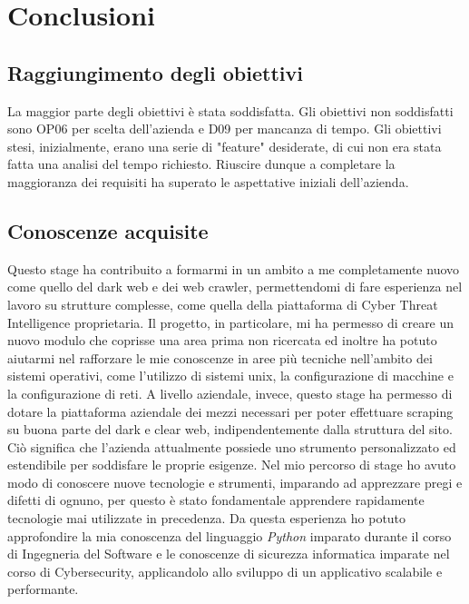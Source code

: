 

\chapter{Conclusioni}
\label{cap:conclusioni}

\section{Raggiungimento degli obiettivi}
La maggior parte degli obiettivi è stata soddisfatta. Gli obiettivi non soddisfatti sono OP06 per scelta dell'azienda e D09 per mancanza di tempo. Gli obiettivi stesi, inizialmente, erano una serie di "feature" desiderate, di cui non era stata fatta una analisi del tempo richiesto. Riuscire dunque a completare la maggioranza dei requisiti ha superato le aspettative iniziali dell'azienda.

\section{Conoscenze acquisite}
Questo stage ha contribuito a formarmi in un ambito a me completamente nuovo come quello del dark web e dei web crawler, permettendomi di fare esperienza nel lavoro su strutture complesse, come quella della piattaforma di Cyber Threat Intelligence proprietaria. Il progetto, in particolare, mi ha permesso di creare un nuovo modulo che coprisse una area prima non ricercata ed inoltre ha potuto aiutarmi nel rafforzare le mie conoscenze in aree più tecniche nell'ambito dei sistemi operativi, come l'utilizzo di sistemi unix, la configurazione di macchine e la configurazione di reti. A livello aziendale, invece, questo stage ha permesso di dotare la piattaforma aziendale dei mezzi necessari per poter effettuare scraping su buona parte del dark e clear web, indipendentemente dalla struttura del sito. Ciò significa che l’azienda attualmente possiede uno strumento personalizzato ed estendibile per soddisfare le proprie esigenze. \newline{}
Nel mio percorso di stage ho avuto modo di conoscere nuove tecnologie e strumenti, imparando ad apprezzare pregi e difetti di ognuno, per questo è stato fondamentale apprendere rapidamente tecnologie mai utilizzate in precedenza.
Da questa esperienza ho potuto approfondire la mia conoscenza del linguaggio \textit{Python} imparato durante il corso di Ingegneria del Software e le conoscenze di sicurezza informatica imparate nel corso di Cybersecurity, applicandolo allo sviluppo di un applicativo scalabile e performante.

